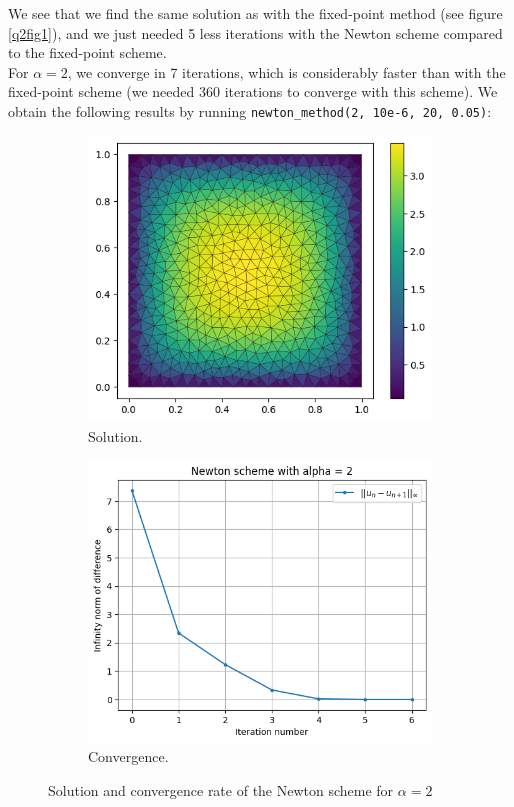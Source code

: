 \documentclass[11pt, a4paper, twoside]{article}
\begin{document}
We see that we find the same solution as with the fixed-point method (see figure \ref{q2fig1}), and we just needed 5 less iterations with the Newton scheme compared to the fixed-point scheme.\\


For $\alpha=2$, we converge in 7 iterations, which is considerably faster than with the fixed-point scheme (we needed 360 iterations to converge with this scheme). We obtain the following results by running \verb+newton_method(2, 10e-6, 20, 0.05)+:

\begin{figure}[H]
\begin{subfigure}[h]{0.5\linewidth}
\includegraphics[scale = 0.6]{../Figures/newt_sol_alpha2.png}
\caption{Solution.}
\label{q3fig3}
\end{subfigure}
\hfill
\begin{subfigure}[h]{0.5\linewidth}
\includegraphics[scale = 0.6]{../Figures/newt_conv_alpha2.png}
\caption{Convergence.}
\label{q3fig4}
\end{subfigure}%
\caption{Solution and convergence rate of the Newton scheme for $\alpha=2$}
\end{figure}
\end{document}
